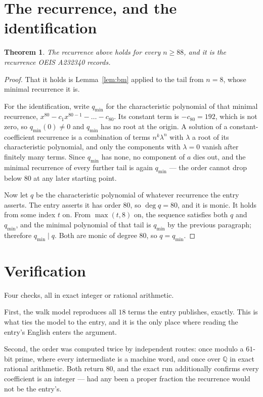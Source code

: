 \documentclass[11pt,a4paper]{article}
\theoremstyle{plain}
\newtheorem{theorem}{Theorem}
\theoremstyle{definition}
\begin{document}
\section{The recurrence, and the identification}

\begin{theorem}
The recurrence above holds for every $n\ge88$, and it is the recurrence OEIS A232340 records.
\end{theorem}

\begin{proof}
That it holds is Lemma~\ref{lem:bm} applied to the tail from $n=8$, whose minimal
recurrence it is.

For the identification, write $q_{\min}$ for the characteristic polynomial of that minimal
recurrence, $x^{80}-c_1x^{80-1}-\dots-c_{80}$. Its constant term is
$-c_{80}=192$, which is not zero, so $q_{\min}(0)\neq0$ and $q_{\min}$ has no
root at the origin. A solution of a constant-coefficient recurrence is a combination of terms
$n^{k}\lambda^{n}$ with $\lambda$ a root of its characteristic polynomial, and only the
components with $\lambda=0$ vanish after finitely many terms. Since $q_{\min}$ has none, no
component of $a$ dies out, and the minimal recurrence of every further tail is again
$q_{\min}$ --- the order cannot drop below $80$ at any later starting point.

Now let $q$ be the characteristic polynomial of whatever recurrence the entry asserts. The
entry asserts it has order $80$, so $\deg q=80$, and it is monic. It holds from some
index $t$ on. From $\max(t,8)$ on, the sequence satisfies both $q$ and $q_{\min}$, and
the minimal polynomial of that tail is $q_{\min}$ by the previous paragraph; therefore
$q_{\min}\mid q$. Both are monic of degree $80$, so $q=q_{\min}$.
\end{proof}

\section{Verification}

Four checks, all in exact integer or rational arithmetic.

First, the walk model reproduces all $18$ terms the entry publishes, exactly. This is
what ties the model to the entry, and it is the only place where reading the entry's English
enters the argument.

Second, the order was computed twice by independent routes: once modulo a $61$-bit prime, where
every intermediate is a machine word, and once over $\mathbb{Q}$ in exact rational arithmetic.
Both return $80$, and the exact run additionally confirms every coefficient is an integer
--- had any been a proper fraction the recurrence would not be the entry's.
\end{document}
